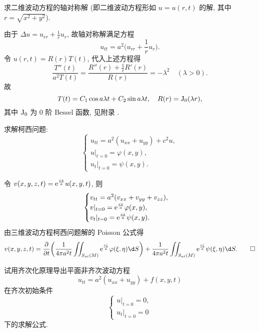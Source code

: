 \begin{exercise}
  求二维波动方程的轴对称解 (即二维波动方程形如 $u=u(r,t)$ 的解, 其中 $r=\sqrt{x^2+y^2}$).
\end{exercise}

\begin{solve}
  由于 $\Delta u = u_{rr} + \frac{1}{r}u_r$, 故轴对称解满足方程
  \[u_{tt} = a^2\biggl(u_{rr}+\frac{1}{r}u_r\biggr).\]
  令 $u(r,t) = R(r)T(t)$, 代入上述方程得
  \[\frac{T''(t)}{a^2T(t)} = \frac{R''(r)+\frac{1}{r}R'(r)}{R(r)} = -\lambda^2
    \quad (\lambda>0).\]
  故
  \[T(t) = C_1\cos a\lambda t + C_2\sin a\lambda t,
    \quad R(r) = {\rm J}_0(\lambda r),\]
  其中 ${\rm J}_0$ 为 0 阶 Bessel 函数, 见附录 \uppercase\expandafter{}.
\end{solve}


\begin{exercise}
  求解柯西问题:
  \[\begin{cases}
    u_{tt} = a^2(u_{xx}+u_{yy}) + c^2u, \\
    u|_{t=0} = \varphi(x,y), \\
    u_t|_{t=0} = \psi(x,y).
  \end{cases}\]
\end{exercise}

\begin{solve}
  令 $v(x,y,z,t) = \mathrm{e}^{\frac{cz}{a}} u(x,y,t)$, 则
  \[\begin{cases}
    v_{tt} = a^2(v_{xx} + v_{yy} + v_{zz}), \\
    v|_{t=0} = \mathrm{e}^{\frac{cz}{a}}\varphi(x,y), \\
    v_t|_{t=0} = \mathrm{e}^{\frac{cz}{a}}\psi(x,y).
  \end{cases}\]
  由三维波动方程柯西问题解的 Poisson 公式得
  \[ v(x,y,z,t) = \frac{\partial}{\partial t}
    \biggl(\frac{1}{4\pi a^2t}\iint_{S_{at}(M)} \e^{\frac{c\zeta}{a}}\varphi(\xi,\eta)\d S\biggr)
    + \frac{1}{4\pi a^2t}\iint_{S_{at}(M)} \e^{\frac{c\zeta}{a}}\psi(\xi,\eta)\d S. \qedhere \]
\end{solve}


\begin{exercise}[6]
  试用齐次化原理导出平面非齐次波动方程
  \[u_{tt} = a^2(u_{xx}+u_{yy})+f(x,y,t)\]
  在齐次初始条件
  \[\begin{cases}
    u|_{t=0} = 0, \\
    u_t|_{t=0} = 0
  \end{cases}\]
  下的求解公式.
\end{exercise}


